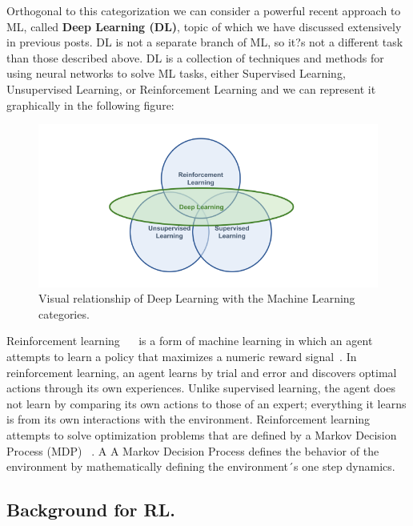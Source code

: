 Orthogonal to this categorization we can consider a powerful recent approach to ML, called \textbf{Deep Learning (DL)}, topic of which we have discussed extensively in previous posts. DL is not a separate branch of ML, so it?s not a different task than those described above. DL is a collection of techniques and methods for using neural networks to solve ML tasks, either Supervised Learning, Unsupervised Learning, or Reinforcement Learning and we can represent it graphically in the following figure:

\begin{figure}[htbp]
	\centering
	\includegraphics[scale=0.50]{imaxes/deep_learning.png}
	\caption{Visual relationship of Deep Learning with the Machine Learning categories.}
	\label{mlcategories}
\end{figure}


Reinforcement learning ~\cite{reinfLearning}~\cite{introReinf} is a form of machine learning in which an agent attempts to
learn a policy that maximizes a numeric reward signal~\cite{introReinf}. In reinforcement learning,
an agent learns by trial and error and discovers optimal actions through its own experiences. Unlike supervised learning, the agent does not learn by comparing its own actions to those of an expert; everything it learns is from its own interactions with the environment. Reinforcement learning attempts to solve optimization problems that are
defined by a Markov Decision Process (MDP) ~\cite{introReinf}. A A Markov Decision Process defines
the behavior of the environment by mathematically defining the environment´s one step dynamics.\\


\subsection{Background for RL.}

